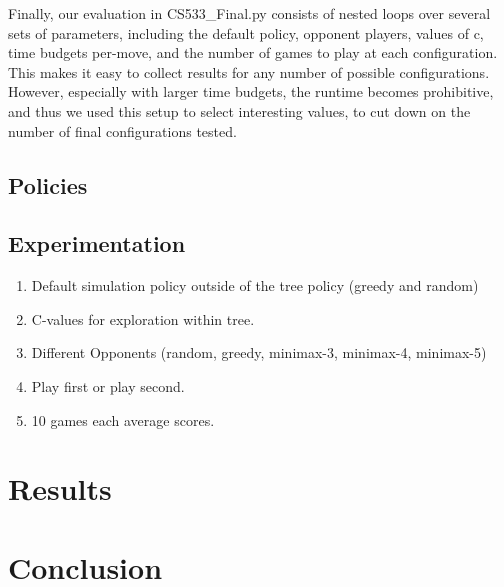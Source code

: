 \documentclass[12pt,letterpaper]{article}
\begin{document}
Finally, our evaluation in CS533\_Final.py consists of nested loops over several sets of parameters, including the default policy, opponent players, values of c, time budgets per-move, and the number of games to play at each configuration. This makes it easy to collect results for any number of possible configurations. However, especially with larger time budgets, the runtime becomes prohibitive, and thus we used this setup to select interesting values, to cut down on the number of final configurations tested.

\subsection{Policies}

\subsection{Experimentation}



\begin{enumerate}
\item Default simulation policy outside of the tree policy (greedy and random)
\item C-values for exploration within tree.
\item Different Opponents (random, greedy, minimax-3, minimax-4, minimax-5)
\item Play first or play second.
\item 10 games each average scores.

\end{enumerate}

\section{Results}
\label{results}


\section{Conclusion}
\label{conc}
\end{document}

